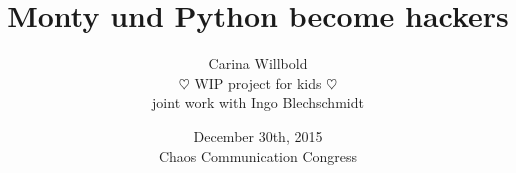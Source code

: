 \documentclass[12pt,ngerman,compress]{beamer}
\title[Python for kids]{\large Monty und Python become hackers}
\author[Carina Willbold]{\small Carina Willbold \\ $\heartsuit$ WIP project for kids $\heartsuit$ \\ \vspace*{1 cm}\small{joint work with Ingo Blechschmidt}}
\institute[Universität Augsburg]{}
\date{%
\vspace{1em} December 30th, 2015 \\ Chaos Communication Congress}
\begin{document}
\frame{\titlepage}






\end{document}
